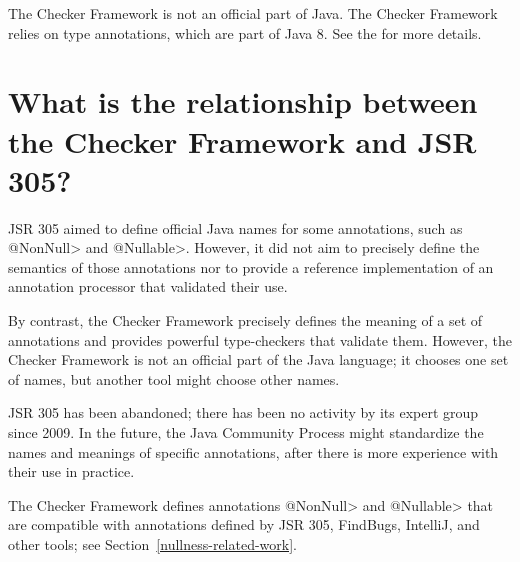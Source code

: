 The Checker Framework is not an official part of Java.
The Checker Framework relies on
type annotations, which are part of Java 8.  See the
 for more details.


\section{What is the relationship between the Checker Framework and JSR 305?\label{faq-jsr-305}}

JSR 305 aimed to define official Java names for some annotations, such as
\<@NonNull> and \<@Nullable>.  However, it did not aim to precisely define
the semantics of those annotations nor to provide a reference
implementation of an annotation processor that validated their use.

By contrast, the Checker Framework precisely defines the meaning of a set
of annotations and provides powerful type-checkers that validate them.
However, the Checker Framework is not an official part of the Java
language; it chooses one set of names, but another tool might choose other
names.

JSR 305 has been abandoned; there has been
no activity by its expert group since
2009.
In the future, the Java Community Process might standardize the names and
meanings of specific annotations, after there is more experience with their
use in practice.

The Checker Framework defines annotations \<@NonNull> and \<@Nullable> that
are compatible with annotations defined by JSR 305, FindBugs, IntelliJ, and
other tools; see Section~\ref{nullness-related-work}.


